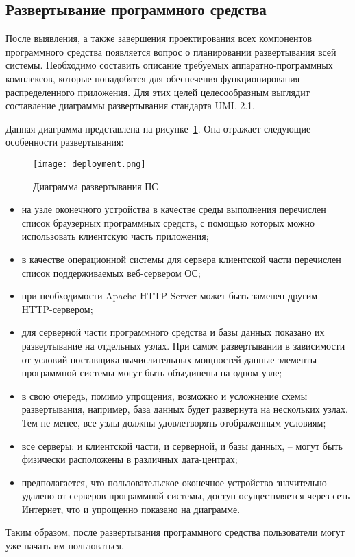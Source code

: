 \subsection{Развертывание программного средства}
\label{sec:design:deployment}

После выявления, а также завершения проектирования всех компонентов программного средства появляется вопрос о
планировании развертывания всей системы. Необходимо составить описание требуемых аппаратно-программных комплексов,
которые понадобятся для обеспечения функционирования распределенного приложения. Для этих целей целесообразным выглядит
составление диаграммы развертывания стандарта UML 2.1.

Данная диаграмма представлена на рисунке~\ref{fig:design:deployment:diagram}. Она отражает следующие особенности развертывания:

\begin{figure}[!ht]
  \centering
    \texttt{[image: deployment.png]}
    \caption{Диаграмма развертывания ПС}
    \label{fig:design:deployment:diagram}
  \end{figure}

\begin{itemize}
  \item на узле оконечного устройства в качестве среды выполнения перечислен список браузерных программных средств, с
  помощью которых можно использовать клиентскую часть приложения;
	\item в качестве операционной системы для сервера клиентской части перечислен список поддерживаемых веб-сервером ОС;
	\item при необходимости Apache HTTP Server может быть заменен другим HTTP-сервером;
  \item для серверной части программного средства и базы данных показано их развертывание на отдельных узлах. При
  самом развертывании в зависимости от условий поставщика вычислительных мощностей данные элементы программной системы
  могут быть объединены на одном узле;
  \item в свою очередь, помимо упрощения, возможно и усложнение схемы развертывания, например, база данных будет
  развернута на нескольких узлах. Тем не менее, все узлы должны удовлетворять отображенным условиям;
  \item все серверы: и клиентской части, и серверной, и базы данных, -- могут быть физически расположены в
  различных дата-центрах;
  \item предполагается, что пользовательское оконечное устройство зна\-чи\-те\-льно удалено от серверов программной
  системы, доступ осуществляется через сеть Интернет, что и упрощенно показано на диаграмме.
\end{itemize}

Таким образом, после развертывания программного средства пользователи могут уже начать им пользоваться.
